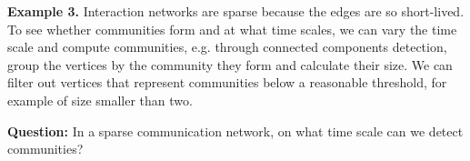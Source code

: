 {\bf Example 3.}  Interaction networks are sparse because the edges
are so short-lived.  To see whether communities form and at what time
scales, we can vary the time scale and compute communities,
e.g. through connected components detection, group the vertices by the
community they form and calculate their size.  We can filter out
vertices that represent communities below a reasonable threshold, for
example of size smaller than two.


{\bf Question:} In a sparse communication network, on what time scale can we
detect communities?

